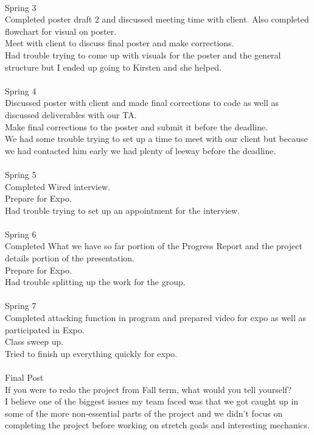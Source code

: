\\
Spring 3\\
Completed poster draft 2 and discussed meeting time with client. Also completed flowchart for visual on poster.\\ Meet with client to discuss final poster and make corrections.\\ Had trouble trying to come up with visuals for the poster and the general structure but I ended up going to Kirsten and she helped.\\
\\
Spring 4\\
Discussed poster with client and made final corrections to code as well as discussed deliverables with our TA.\\ Make final corrections to the poster and submit it before the deadline.\\ We had some trouble trying to set up a time to meet with our client but because we had contacted him early we had plenty of leeway before the deadline.\\
\\
Spring 5\\
Completed Wired interview.\\ Prepare for Expo.\\ Had trouble trying to set up an appointment for the interview.\\
\\
Spring 6\\
Completed What we have so far portion of the Progress Report and the project details portion of the presentation.\\ Prepare for Expo.\\ Had trouble splitting up the work for the group.\\
\\
Spring 7\\
Completed attacking function in program and prepared video for expo as well as participated in Expo.\\ Class sweep up.\\ Tried to finish up everything quickly for expo.\\
\\
Final Post\\
If you were to redo the project from Fall term, what would you tell yourself?\\
I believe one of the biggest issues my team faced was that we got caught up in some of the more non-essential parts of the project and we didn't focus on completing the project before working on stretch goals and interesting mechanics.\\
